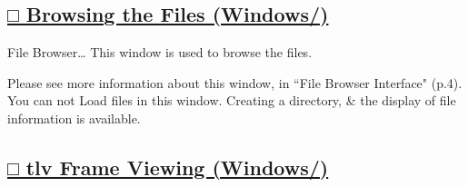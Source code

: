 \documentclass[a4paper,10pt]{article}
\begin{document}
\newpage

\subsection*{\uline{□ Browsing the Files (Windows/)}}

\normalsize
\noindent File Browser… This window is used to browse the files.\par
\footnotesize
\noindent Please see more information about this window, in “File Browser Interface" (p.4).\\
You can not Load files in this window. Creating a directory, \& the display of file information is available.\\

\subsection*{\uline{□ tlv Frame Viewing (Windows/)}}
\end{document}
